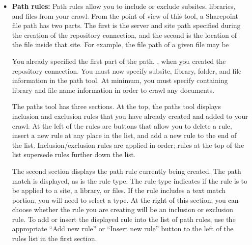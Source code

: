 \begin{itemize}


\item \textbf{Path rules:} \label{pathrules}
Path rules allow you to include or exclude
subsites, libraries, and files from your crawl. From the point of view
of this tool, a Sharepoint file path has two parts. The first is the
server and site path specified during the creation of the repository
connection, and the second is the location of the file inside that
site. For example, the file path of a given file may be

\begin{changemargin}{-1.5in}{0in}
\end{changemargin}

You already specified the first part of the path,
, when you created the
repository connection. You must now specify subsite, library, folder,
and file information in the path tool. At minimum, you must specify
containing library and file name information in order to crawl any
documents.


The paths tool has
three sections. At the top, the paths tool displays inclusion and 
exclusion rules that you have already created and added to your
crawl. At the left of the rules are buttons that allow you to delete a
rule, insert a new rule at any place in the list, and add a new rule
to the end of the list. Inclusion/exclusion rules are applied in
order; rules at the top of the list supersede rules further down the
list.

The second section displays the path rule currently being created. The
path match is displayed, as is the rule type. The rule type indicates
if the rule is to be applied to a site, a library, or files. If the
rule includes a text match portion, you will need to select a type. At
the right of this section, you can choose whether the rule you are
creating will be an inclusion or exclusion rule. To add or insert the
displayed rule into the list of path rules, use the appropriate
``Add new rule'' or ``Insert new rule'' button to the left of the
rules list in the first section.


\end{itemize}
